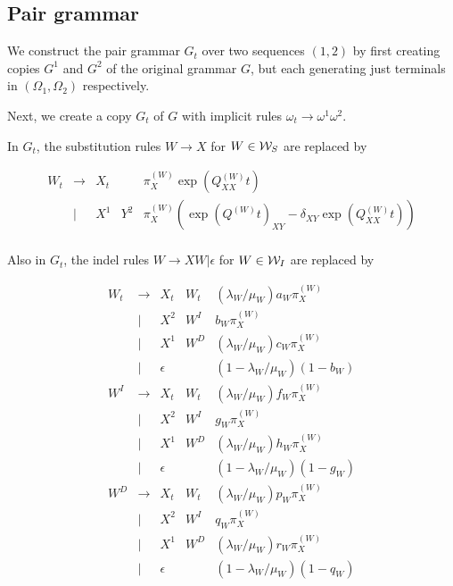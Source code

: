 \documentclass{article}
\begin{document}
\subsection{Pair grammar}

We construct the pair grammar $G_t$ over two sequences $(1,2)$
by first creating copies $G^1$ and $G^2$ of the original grammar $G$,
but each generating just terminals in $(\Omega_1,\Omega_2)$ respectively.

Next, we create a copy $G_t$ of $G$ with implicit rules $\omega_t \to \omega^1 \omega^2$.

In $G_t$, the substitution rules $W \to X$ for $W \in {\cal W}_S$ are replaced by

\[
\begin{array}{rclll}
  W_t & \to & X_t & & \pi^{(W)}_X \exp(Q^{(W)}_{XX} t) \\
      & | & X^1 & Y^2 & \pi^{(W)}_X (\exp(Q^{(W)} t)_{XY} - \delta_{XY} \exp(Q^{(W)}_{XX} t)) \\
\end{array}
\]

Also in $G_t$, the indel rules $W \to X W|\epsilon$ for $W \in {\cal W}_I$ are replaced by

\[
\begin{array}{rclll}
  W_t & \to & X_t & W_t & (\lambda_W/\mu_W) a_W \pi^{(W)}_X  \\
      & | & X^2 & W^I & b_W \pi^{(W)}_X \\
      & | & X^1 & W^D & (\lambda_W/\mu_W) c_W \pi^{(W)}_X \\
      & | & \epsilon & & (1 - \lambda_W/\mu_W) (1-b_W) \\
  W^I & \to & X_t & W_t & (\lambda_W/\mu_W) f_W \pi^{(W)}_X \\
      & | & X^2 & W^I & g_W \pi^{(W)}_X \\
      & | & X^1 & W^D & (\lambda_W/\mu_W) h_W \pi^{(W)}_X \\
      & | & \epsilon & & (1 - \lambda_W/\mu_W) (1-g_W) \\
  W^D & \to & X_t & W_t & (\lambda_W/\mu_W) p_W \pi^{(W)}_X \\
      & | & X^2 & W^I & q_W \pi^{(W)}_X \\
      & | & X^1 & W^D & (\lambda_W/\mu_W) r_W \pi^{(W)}_X \\
      & | & \epsilon & & (1 - \lambda_W/\mu_W) (1-q_W) \\
\end{array}
\]



\end{document}

